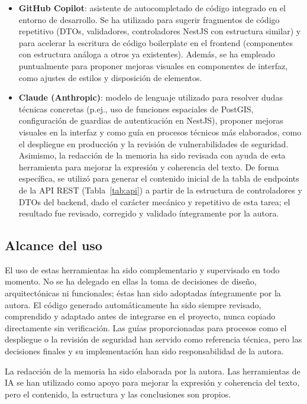 \begin{itemize}
    \item \textbf{GitHub Copilot}: asistente de autocompletado de código integrado en el entorno de desarrollo. Se ha utilizado para sugerir fragmentos de código repetitivo (DTOs, validadores, controladores NestJS con estructura similar) y para acelerar la escritura de código boilerplate en el frontend (componentes con estructura análoga a otros ya existentes). Además, se ha empleado puntualmente para proponer mejoras visuales en componentes de interfaz, como ajustes de estilos y disposición de elementos.

    \item \textbf{Claude (Anthropic)}: modelo de lenguaje utilizado para resolver dudas técnicas concretas (p.ej., uso de funciones espaciales de PostGIS, configuración de guardias de autenticación en NestJS), proponer mejoras visuales en la interfaz y como guía en procesos técnicos más elaborados, como el despliegue en producción y la revisión de vulnerabilidades de seguridad. Asimismo, la redacción de la memoria ha sido revisada con ayuda de esta herramienta para mejorar la expresión y coherencia del texto. De forma específica, se utilizó para generar el contenido inicial de la tabla de endpoints de la API REST (Tabla~\ref{tab:api}) a partir de la estructura de controladores y DTOs del backend, dado el carácter mecánico y repetitivo de esta tarea; el resultado fue revisado, corregido y validado íntegramente por la autora.
\end{itemize}

\subsection{Alcance del uso}

El uso de estas herramientas ha sido complementario y supervisado en todo momento. No se ha delegado en ellas la toma de decisiones de diseño, arquitectónicas ni funcionales; éstas han sido adoptadas íntegramente por la autora. El código generado automáticamente ha sido siempre revisado, comprendido y adaptado antes de integrarse en el proyecto, nunca copiado directamente sin verificación. Las guías proporcionadas para procesos como el despliegue o la revisión de seguridad han servido como referencia técnica, pero las decisiones finales y su implementación han sido responsabilidad de la autora.

La redacción de la memoria ha sido elaborada por la autora. Las herramientas de IA se han utilizado como apoyo para mejorar la expresión y coherencia del texto, pero el contenido, la estructura y las conclusiones son propios.

